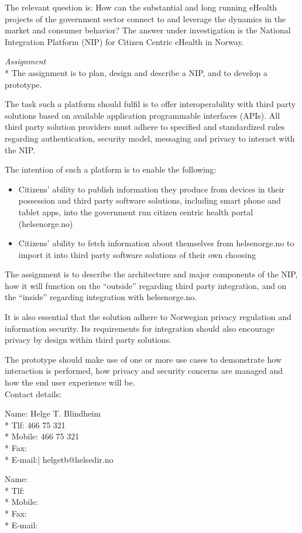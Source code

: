 The relevant question is: How can the substantial and long running eHealth projects of the government sector connect to and leverage the dynamics in the market and consumer behavior? 
The answer under investigation is the National Integration Platform (NIP) for Citizen Centric eHealth in Norway. 

\textit{Assignment} \\* 
The assignment is to plan, design and describe a NIP, and to develop a prototype.

The task such a platform should fulfil is to offer interoperability with third party solutions based on available application programmable interfaces (APIs).
All third party solution providers must adhere to specified and standardized rules regarding authentication, security model, messaging and privacy to interact with the NIP. 

The intention of such a platform is to enable the following:
\begin{itemize}
\item Citizens’ ability to publish information they produce from devices in their possession and third party software solutions, including smart phone and tablet apps, into the government run citizen centric health portal (helsenorge.no)
\item Citizens’ ability to fetch information about themselves from helsenorge.no to import it into third party software solutions of their own choosing
\end{itemize}

The assignment is to describe the architecture and major components of the NIP, how it will function on the “outside” regarding third party integration, and on the “inside” regarding integration with helsenorge.no.

It is also essential that the solution adhere to Norwegian privacy regulation and information security. 
Its requirements for integration should also encourage privacy by design within third party solutions.

The prototype should make use of one or more use cases to demonstrate how interaction is performed, how privacy and security concerns are managed and how the end user experience will be. \\


Contact details: 

Name:		Helge T. Blindheim \\*
Tlf:		466 75 321 \\*
Mobile:		466 75 321 \\*
Fax:		\\*
E-mail:|	helgetb@helsedir.no

Name: \\*
Tlf: \\*
Mobile: \\*
Fax: \\*
E-mail: \\
